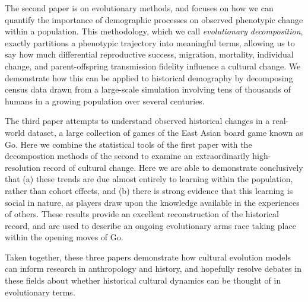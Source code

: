 \documentclass[letterpaper, 12pt, oneside]{book}
\begin{document}
The second paper is on evolutionary methods, and focuses on how we can quantify the importance of demographic processes on observed phenotypic change within a population.  This methodology, which we call \textit{evolutionary decomposition}, exactly partitions a phenotypic trajectory into meaningful terms, allowing us to say how much differential reproductive success, migration, mortality, individual change, and parent-offspring transmission fidelity influence a cultural change.  We demonstrate how this can be applied to historical demography by decomposing census data drawn from a large-scale simulation involving tens of thousands of humans in a growing population over several centuries.

The third paper attempts to understand observed historical changes in a real-world dataset, a large collection of games of the East Asian board game known as Go.  Here we combine the statistical tools of the first paper with the decompostion methods of the second to examine an extraordinarily high-resolution record of cultural change.  Here we are able to demonstrate conclusively that (a) these trends are due almost entirely to learning within the population, rather than cohort effects, and (b) there is strong evidence that this learning is social in nature, as players draw upon the knowledge available in the experiences of others.  These results provide an excellent reconstruction of the historical record, and are used to describe an ongoing evolutionary arms race taking place within the opening moves of Go.  

Taken together, these three papers demonstrate how cultural evolution models can inform research in anthropology and history, and hopefully resolve debates in these fields about whether historical cultural dynamics can be thought of in evolutionary terms.  
\end{document}

